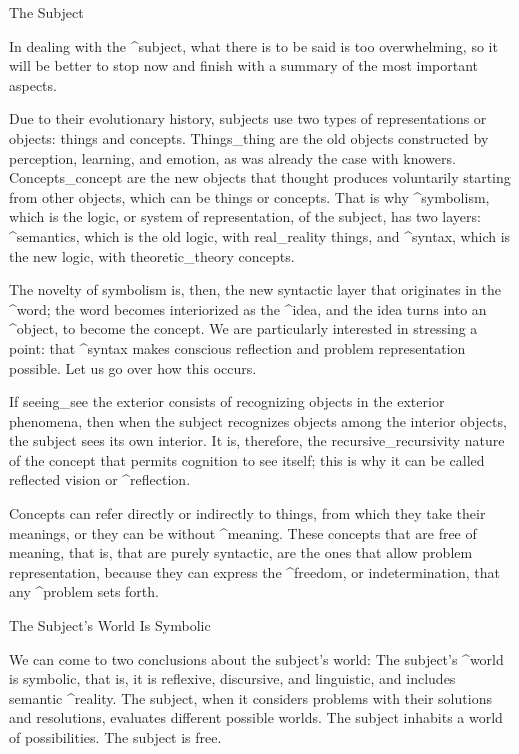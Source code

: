 \Section The Subject

In dealing with the ^{subject}, what there is to be said is too
overwhelming, so it will be better to stop now and finish with a summary
of the most important aspects.

Due to their evolutionary history, subjects use two types of
representations or objects: things and concepts. Things_{thing} are the
old objects constructed by perception, learning, and emotion, as was
already the case with knowers. Concepts_{concept} are the new objects
that thought produces voluntarily starting from other objects, which can
be things or concepts. That is why ^{symbolism}, which is the logic, or
system of representation, of the subject, has two layers: ^{semantics},
which is the old logic, with real_{reality} things, and ^{syntax}, which
is the new logic, with theoretic_{theory} concepts.

The novelty of symbolism is, then, the new syntactic layer that
originates in the ^{word}; the word becomes interiorized as the ^{idea},
and the idea turns into an ^{object}, to become the concept. We are
particularly interested in stressing a point: that ^{syntax} makes
conscious reflection and problem representation possible. Let us go over
how this occurs.


If seeing_{see} the exterior consists of recognizing objects in the
exterior phenomena, then when the subject recognizes objects among the
interior objects, the subject sees its own interior. It is, therefore,
the recursive_{recursivity} nature of the concept that permits cognition
to see itself; this is why it can be called reflected vision or
^{reflection}.

Concepts can refer directly or indirectly to things, from which they
take their meanings, or they can be without ^{meaning}. These concepts
that are free of meaning, that is, that are purely syntactic, are the
ones that allow problem representation, because they can express the
^{freedom}, or indetermination, that any ^{problem} sets forth.


\Section The Subject's World Is Symbolic

We can come to two conclusions about the subject's world:
\beginpoints
\point The subject's ^{world} is symbolic, that is, it is reflexive,
discursive, and linguistic, and includes semantic ^{reality}.
\point The subject, when it considers problems with their solutions
and resolutions, evaluates different possible worlds. The subject
inhabits a world of possibilities. The subject is free.
\endpoints


\endinput

